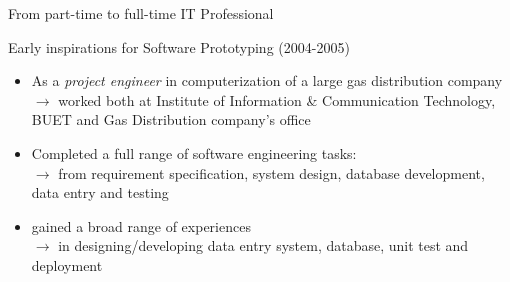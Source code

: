 \documentclass{beamer}
\begin{document}
\begin{frame}{From part-time to full-time IT Professional}
\begin{block}{Early inspirations for Software Prototyping (2004-2005)}
\begin{itemize}
\item \small As a \alert{\textit{project engineer}} in computerization of a large gas distribution company\\ 
$\rightarrow$ \scriptsize worked both at Institute of Information \& Communication Technology, BUET and Gas Distribution company's office
\item \small Completed \alert{a full range of software engineering tasks:}\\
$\rightarrow$ \scriptsize from requirement specification, system design, database development, data entry and testing\\ 
\item \small  gained \alert{a broad range of experiences}\\
$\rightarrow$ \scriptsize in designing/developing \alert{data entry system, database, unit test and deployment} 
\end{itemize}
\end{block}
\end{frame}
\end{document}
